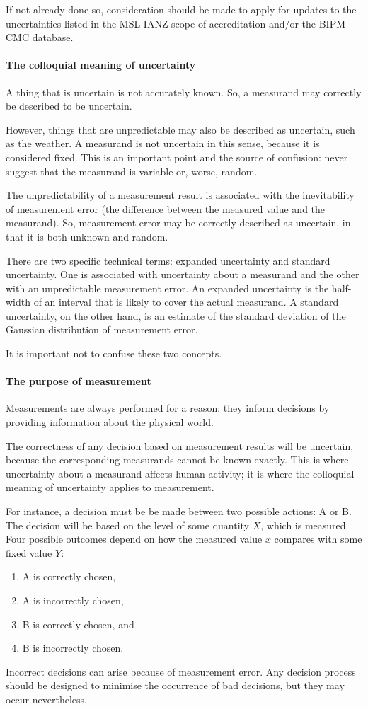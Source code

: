 If not already done so, consideration should be made to apply for updates to the uncertainties listed in the MSL IANZ scope of accreditation and/or the BIPM CMC database.

\paragraph{The colloquial meaning of uncertainty}
A thing that is uncertain is not accurately known. So, a measurand may correctly be described to be uncertain. 

However, things that are unpredictable may also be described as uncertain, such as the weather. A measurand is not uncertain in this sense, because it is considered fixed. This is an important point and the source of confusion: never suggest that the measurand is variable or, worse, random. 

The unpredictability of a measurement result is associated with the inevitability of measurement error (the difference between the measured value and the measurand). So, measurement error may be correctly described as uncertain, in that it is both unknown and random.

There are two specific technical terms: expanded uncertainty and standard uncertainty. One is associated with uncertainty about a measurand and the other with an unpredictable measurement error. An expanded uncertainty is the half-width of an interval that is likely to cover the actual measurand. A standard uncertainty, on the other hand, is an estimate of the standard deviation of the Gaussian distribution of measurement error.

It is important not to confuse these two concepts.

\paragraph{The purpose of measurement}
Measurements are always performed for a reason: they inform decisions by providing information about the physical world. 

The correctness of any decision based on measurement results will be uncertain, because the corresponding measurands cannot be known exactly. This is where uncertainty about a measurand affects human activity; it is where the colloquial meaning of uncertainty applies to measurement. 

For instance, a decision must be be made between two possible actions: A or B. The decision will be based on the level of some quantity $X$, which is measured. Four possible outcomes depend on how the measured value $x$ compares with some fixed value $Y$: 
\begin{enumerate}[label=\roman*)]
\item A is correctly chosen, 
\item A is incorrectly chosen, 
\item B is correctly chosen, and 
\item B is incorrectly chosen.
\end{enumerate} 
Incorrect decisions can arise because of measurement error. Any decision process should be designed to minimise the occurrence of bad decisions, but they may occur nevertheless. 

